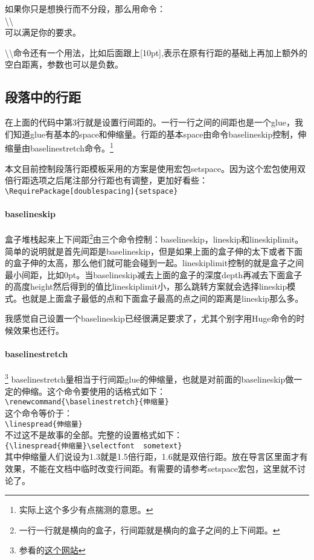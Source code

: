 如果你只是想换行而不分段，那么用命令：\\
\textbackslash \textbackslash \\
可以满足你的要求。

\textbackslash \textbackslash 命令还有一个用法，比如后面跟上[10pt],表示在原有行距的基础上再加上额外的空白距离，参数也可以是负数。

\subsection[段落中的行距]{段落中的行距}
在上面的代码中第3行就是设置行间距的。一行一行之间的间距也是一个glue，我们知道glue有基本的space和伸缩量。行距的基本space由命令baselineskip控制，伸缩量由baselinestretch命令。\footnote{实际上这个多少有点揣测的意思。}

本文目前控制段落行距模板采用的方案是使用宏包setspace。因为这个宏包使用双倍行距选项之后尾注部分行距也有调整，更加好看些：\\
\verb+\RequirePackage[doublespacing]{setspace}+

\paragraph{baselineskip} 
盒子堆栈起来上下间距\footnote{一行一行就是横向的盒子，行间距就是横向的盒子之间的上下间距。}由三个命令控制：baselineskip，lineskip和lineskiplimit。简单的说明就是首先间距是baselineskip，但是如果上面的盒子伸的太下或者下面的盒子伸的太高，那么他们就可能会碰到一起。lineskiplimit控制的就是盒子之间最小间距，比如0pt。当baselineskip减去上面的盒子的深度depth再减去下面盒子的高度height然后得到的值比lineskiplimit小，那么跳转方案就会选择lineskip模式。也就是上面盒子最低的点和下面盒子最高的点之间的距离是lineskip那么多。

我感觉自己设置一个baselineskip已经很满足要求了，尤其个别字用Huge命令的时候效果也还行。

\paragraph{baselinestretch}\footnote{参看的\href{http://www.tex.ac.uk/cgi-bin/texfaq2html?label=linespread}{这个网站}}
baselinestretch量相当于行间距glue的伸缩量，也就是对前面的baselineskip做一定的伸缩。这个命令要使用的话格式如下：\\
\verb+\renewcommand{\baselinestretch}{伸缩量}+\\
这个命令等价于：\\
\verb+\linespread{伸缩量}+\\
不过这不是故事的全部。完整的设置格式如下：\\
\verb+{\linespread{伸缩量}\selectfont  sometext}+\\
其中伸缩量人们说设为1.3就是1.5倍行距，1.6就是双倍行距。放在导言区里面才有效果，不能在文档中临时改变行间距。有需要的请参考setspace宏包，这里就不讨论了。


